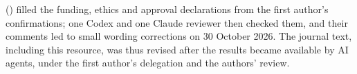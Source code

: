 () filled the funding, ethics and approval declarations from the first author's confirmations; one Codex and one Claude reviewer then checked them, and their comments led to small wording corrections on 30 October 2026. The journal text, including this resource, was thus revised after the results became available by AI agents, under the first author's delegation and the authors' review.

